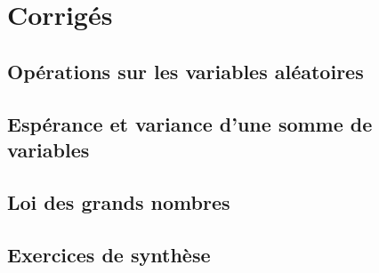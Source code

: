 \documentclass[11pt,fleqn, openany]{book} %
\begin{document}

\chapter{Corrigés}


\section*{Opérations sur les variables aléatoires}

\printsolutions[collection={lgn01}, headings={false} ]

\section*{Espérance et variance d'une somme de variables}

\printsolutions[collection={lgn02}, headings={false} ]

\section*{Loi des grands nombres}

\printsolutions[collection={lgn03}, headings={false} ]

\section*{Exercices de synthèse}


\printsolutions[collection={lgn04}, headings={false} ]
\end{document}
